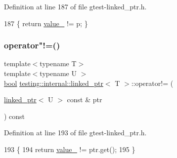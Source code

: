 Definition at line 187 of file gtest-\/linked\+\_\+ptr.\+h.


\begin{DoxyCode}
187 \{ \textcolor{keywordflow}{return} \hyperlink{classtesting_1_1internal_1_1linked__ptr_abb52c4e944fc7a24a4ec7788b612fb37}{value\_} != p; \}
\end{DoxyCode}
\mbox{\label{classtesting_1_1internal_1_1linked__ptr_a4801114a83a9e12b08f90e0d28318f26}} 
\subsubsection{\texorpdfstring{operator"!=()}{operator!=()}\hspace{0.1cm}{\footnotesize\ttfamily [2/2]}}
{\footnotesize\ttfamily template$<$typename T$>$ \\
template$<$typename U $>$ \\
\hyperlink{classbool}{bool} \hyperlink{classtesting_1_1internal_1_1linked__ptr}{testing\+::internal\+::linked\+\_\+ptr}$<$ T $>$\+::operator!= (\begin{DoxyParamCaption}\item[{\hyperlink{classtesting_1_1internal_1_1linked__ptr}{linked\+\_\+ptr}$<$ U $>$ const \&}]{ptr }\end{DoxyParamCaption}) const\hspace{0.3cm}{\ttfamily [inline]}}



Definition at line 193 of file gtest-\/linked\+\_\+ptr.\+h.


\begin{DoxyCode}
193                                                   \{
194     \textcolor{keywordflow}{return} \hyperlink{classtesting_1_1internal_1_1linked__ptr_abb52c4e944fc7a24a4ec7788b612fb37}{value\_} != ptr.get();
195   \}
\end{DoxyCode}
\mbox{\label{classtesting_1_1internal_1_1linked__ptr_ac94ad266bf41cbf979a95ca2870908d9}} 
